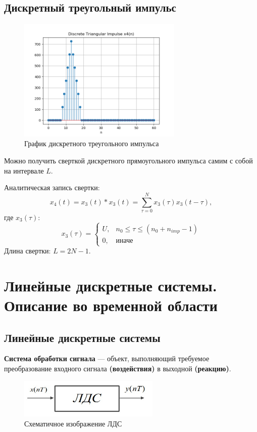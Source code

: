 \documentclass[a4paper, 14pt]{extarticle}
\begin{document}
\clearpage
\subsection{Дискретный треугольный импульс}
\begin{figure}[h]
    \centering
    \includegraphics[width=0.7\textwidth]{img/signals/7.png}
    \caption{График дискретного треугольного импульса}
\end{figure}
Можно получить сверткой дискретного прямоугольного импульса самим с собой на интервале $L$.

Аналитическая запись свертки:
\begin{equation}
    x_4(t) = x_3(t) * x_3(t) = \sum\limits_{\tau = 0}^{N} x_3(\tau) x_3(t - \tau),
\end{equation}
где $x_3(\tau)$:
\begin{equation}
    x_3(\tau) = \begin{cases}
        U, & n_0 \le \tau \le (n_0 + n_{imp} - 1)\\
        0, & \text{иначе}
    \end{cases}
\end{equation}
Длина свертки: $L = 2N - 1$.


\section{Линейные дискретные системы. Описание во временной области}
\subsection{Линейные дискретные системы}\label{subsec:lds}
\textbf{Система обработки сигнала} --- объект, выполняющий требуемое преобразование входного сигнала \textbf{(воздействия)} в выходной \textbf{(реакцию)}.

\begin{figure}[h]
    \centering
    \includegraphics[width=0.6\textwidth]{img/S002.jpg}
    \caption{Схематичное изображение ЛДС}%
\end{figure}
\end{document}
